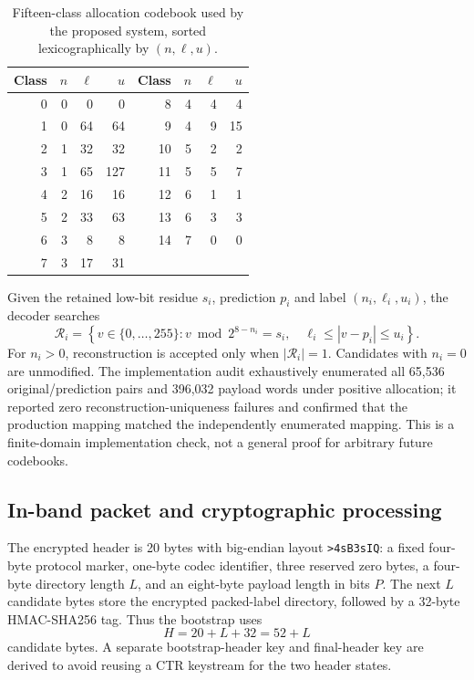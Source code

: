 \documentclass[preprint,12pt,a4paper]{elsarticle}
\begin{document}
\begin{table}[t]
\centering
\caption{Fifteen-class allocation codebook used by the proposed system, sorted lexicographically by $(n,\ell,u)$.}
\label{tab:codebook}
\small
\begin{tabular}{rrrr|rrrr}
\toprule
Class & $n$ & $\ell$ & $u$ & Class & $n$ & $\ell$ & $u$\\
\midrule
0 & 0 & 0 & 0 & 8 & 4 & 4 & 4\\
1 & 0 & 64 & 64 & 9 & 4 & 9 & 15\\
2 & 1 & 32 & 32 & 10 & 5 & 2 & 2\\
3 & 1 & 65 & 127 & 11 & 5 & 5 & 7\\
4 & 2 & 16 & 16 & 12 & 6 & 1 & 1\\
5 & 2 & 33 & 63 & 13 & 6 & 3 & 3\\
6 & 3 & 8 & 8 & 14 & 7 & 0 & 0\\
7 & 3 & 17 & 31 & & & &\\
\bottomrule
\end{tabular}
\end{table}

Given the retained low-bit residue $s_i$, prediction $p_i$ and label $(n_i,\ell_i,u_i)$, the decoder searches
\begin{equation}
\mathcal{R}_i=\left\{v\in\{0,\ldots,255\}:
v\bmod 2^{8-n_i}=s_i,\quad
\ell_i\le |v-p_i|\le u_i\right\}.
\label{eq:inverse-set}
\end{equation}
For $n_i>0$, reconstruction is accepted only when $|\mathcal{R}_i|=1$. Candidates with $n_i=0$ are unmodified. The implementation audit exhaustively enumerated all 65,536 original/prediction pairs and 396,032 payload words under positive allocation; it reported zero reconstruction-uniqueness failures and confirmed that the production mapping matched the independently enumerated mapping. This is a finite-domain implementation check, not a general proof for arbitrary future codebooks.

\subsection{In-band packet and cryptographic processing}

The encrypted header is 20 bytes with big-endian layout \texttt{>4sB3sIQ}: a fixed four-byte protocol marker, one-byte codec identifier, three reserved zero bytes, a four-byte directory length $L$, and an eight-byte payload length in bits $P$. The next $L$ candidate bytes store the encrypted packed-label directory, followed by a 32-byte HMAC-SHA256 tag. Thus the bootstrap uses
\begin{equation}
H=20+L+32=52+L
\label{eq:bootstrap}
\end{equation}
candidate bytes. A separate bootstrap-header key and final-header key are derived to avoid reusing a CTR keystream for the two header states.
\end{document}
